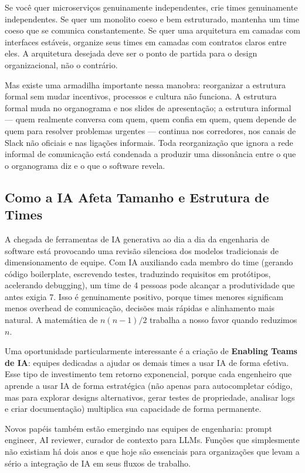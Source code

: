 Se você quer microserviços genuinamente independentes, crie times genuinamente
independentes. Se quer um monolito coeso e bem estruturado, mantenha um time
coeso que se comunica constantemente. Se quer uma arquitetura em camadas com
interfaces estáveis, organize seus times em camadas com contratos claros entre
eles. A arquitetura desejada deve ser o ponto de partida para o design
organizacional, não o contrário.

Mas existe uma armadilha importante nessa manobra: reorganizar a estrutura
formal sem mudar incentivos, processos e cultura não funciona. A estrutura
formal muda no organograma e nos slides de apresentação; a estrutura informal
--- quem realmente conversa com quem, quem confia em quem, quem depende de
quem para resolver problemas urgentes --- continua nos corredores, nos canais
de Slack não oficiais e nas ligações informais. Toda reorganização que ignora
a rede informal de comunicação está condenada a produzir uma dissonância entre
o que o organograma diz e o que o software revela.

\subsection{Como a IA Afeta Tamanho e Estrutura de Times}

A chegada de ferramentas de IA generativa ao dia a dia da engenharia de software
está provocando uma revisão silenciosa dos modelos tradicionais de dimensionamento
de equipe. Com IA auxiliando cada membro do time (gerando código boilerplate,
escrevendo testes, traduzindo requisitos em protótipos, acelerando debugging),
um time de 4 pessoas pode alcançar a produtividade que antes exigia 7. Isso é
genuinamente positivo, porque times menores significam menos overhead de
comunicação, decisões mais rápidas e alinhamento mais natural. A matemática de
$n(n-1)/2$ trabalha a nosso favor quando reduzimos $n$.

Uma oportunidade particularmente interessante é a criação de \textbf{Enabling
Teams de IA}: equipes dedicadas a ajudar os demais times a usar IA de forma
efetiva. Esse tipo de investimento tem retorno exponencial, porque cada
engenheiro que aprende a usar IA de forma estratégica (não apenas para
autocompletar código, mas para explorar designs alternativos, gerar testes
de propriedade, analisar logs e criar documentação) multiplica sua capacidade
de forma permanente.

Novos papéis também estão emergindo nas equipes de engenharia: prompt engineer,
AI reviewer, curador de contexto para LLMs. Funções que simplesmente não
existiam há dois anos e que hoje são essenciais para organizações que levam a
sério a integração de IA em seus fluxos de trabalho.

